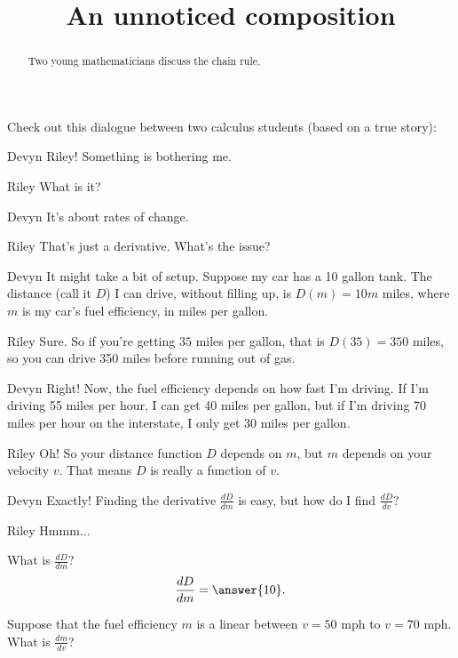 \documentclass{ximera}
\title[Break-Ground:]{An unnoticed composition}
\begin{document}
\begin{abstract}
Two young mathematicians discuss the chain rule.
\end{abstract}
\maketitle

Check out this dialogue between two calculus students (based on a true
story):

\begin{dialogue}
\item[Devyn] Riley! Something is bothering me. 
\item[Riley] What is it?
\item[Devyn]  It's about rates of change.
\item[Riley] That's just a derivative.  What's the issue?
\item[Devyn]  It might take a bit of setup.  Suppose my car has a 10 gallon tank.  The distance (call it $D$) I can drive, without filling up, is $D(m)=10m$ miles, where $m$ is my car's fuel
			efficiency, in miles per gallon.
\item[Riley]  Sure.  So if you're getting $35$ miles per gallon, that is $D(35) = 350$ miles, so you can drive 350 miles before running out of gas.
\item[Devyn] Right!  Now, the fuel efficiency depends on how fast I'm driving.  If I'm driving 55 miles per hour, I can get 40 miles per gallon, but if I'm driving 70 miles per hour on the interstate,
			I only get 30 miles per gallon.
\item[Riley]  Oh!  So your distance function $D$ depends on $m$, but $m$ depends on your velocity $v$.  That means $D$ is really a function of $v$.
\item[Devyn]  Exactly!  Finding the derivative $\frac{dD}{dm}$ is easy, but how do I find $\frac{dD}{dv}$?
\item[Riley]  Hmmm...
\end{dialogue}



\begin{question}
	What is $\frac{dD}{dm}$?
	\[ \frac{dD}{dm} = \answer{10}. \]
\end{question}

\begin{question}
	Suppose that the fuel efficiency $m$ is a linear between $v = 50$ mph to $v= 70$ mph.  What is $\frac{dm}{dv}$?
	\begin{multipleChoice}
	\end{multipleChoice}
\end{question}

\end{document}
